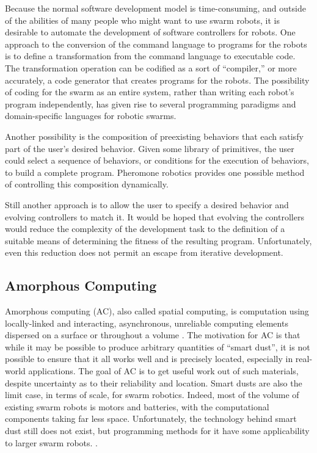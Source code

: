 Because the normal software development model is time-consuming, and outside of the abilities of many people who might want to use swarm robots, it is desirable to automate the development of software controllers for robots. 
One approach to the conversion of the command language to programs for the robots is to define a transformation from the command language to executable code. 
The transformation operation can be codified as a sort of ``compiler,'' or more accurately, a code generator that creates programs for the robots. 
The possibility of coding for the swarm as an entire system, rather than writing each robot's program independently, has given rise to several programming paradigms and domain-specific languages for robotic swarms. 

Another possibility is the composition of preexisting behaviors that each satisfy part of the user's desired behavior. 
Given some library of primitives, the user could select a sequence of behaviors, or conditions for the execution of behaviors, to build a complete program. 
Pheromone robotics provides one possible method of controlling this composition dynamically.
 
Still another approach is to allow the user to specify a desired behavior and evolving controllers to match it. 
It would be hoped that evolving the controllers would reduce the complexity of the development task to the definition of a suitable means of determining the fitness of the resulting program. 
Unfortunately, even this reduction does not permit an escape from iterative development. 

\subsection{Amorphous Computing} \label{section:Amorphous_Computing}

Amorphous computing (AC), also called spatial computing, is computation using locally-linked and interacting, asynchronous, unreliable computing elements dispersed on a surface or throughout a volume \citep{abelson2000amorphous}. 
The motivation for AC is that while it may be possible to produce arbitrary quantities of ``smart dust'', it is not possible to ensure that it all works well and is precisely located, especially in real-world applications.
The goal of AC is to get useful work out of such materials, despite uncertainty as to their reliability and location. 
Smart dusts are also the limit case, in terms of scale, for swarm robotics. 
Indeed, most of the volume of existing swarm robots is motors and batteries, with the computational components taking far less space. 
Unfortunately, the technology behind smart dust still does not exist, but programming methods for it have some applicability to larger swarm robots. \citep{Correll:2017:WRM:3131672.3131702}. 

